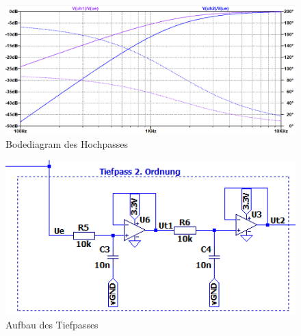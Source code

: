 \newpage
\begin{figure}[htb]
    \includegraphics[width=16cm]{./pictures/Hochpass_Bode}
    \caption{Bodediagram des Hochpasses}
    \label{fig:HochpassBode}
\end{figure}

\begin{figure}[htb]
    \includegraphics[width=16cm]{./pictures/Tiefpass}
    \caption{Aufbau des Tiefpasses}
    \label{fig:Tiefpass}
\end{figure}

